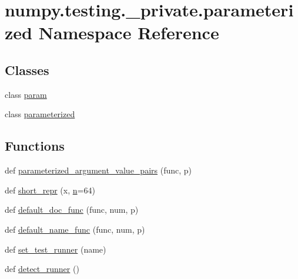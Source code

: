 \hypertarget{namespacenumpy_1_1testing_1_1__private_1_1parameterized}{}\section{numpy.\+testing.\+\_\+private.\+parameterized Namespace Reference}
\label{namespacenumpy_1_1testing_1_1__private_1_1parameterized}
\subsection*{Classes}
\begin{DoxyCompactItemize}
\item 
class \hyperlink{classnumpy_1_1testing_1_1__private_1_1parameterized_1_1param}{param}
\item 
class \hyperlink{classnumpy_1_1testing_1_1__private_1_1parameterized_1_1parameterized}{parameterized}
\end{DoxyCompactItemize}
\subsection*{Functions}
\begin{DoxyCompactItemize}
\item 
def \hyperlink{namespacenumpy_1_1testing_1_1__private_1_1parameterized_a619df385c6fd897bb599e20503b8bf0a}{parameterized\+\_\+argument\+\_\+value\+\_\+pairs} (func, p)
\item 
def \hyperlink{namespacenumpy_1_1testing_1_1__private_1_1parameterized_afdf47621e356527a1b69af42f9722c60}{short\+\_\+repr} (x, \hyperlink{namespacenumpy_a352663c52853d2754274407d5cae2832}{n}=64)
\item 
def \hyperlink{namespacenumpy_1_1testing_1_1__private_1_1parameterized_a4b29c28a2677fa8772a746cad0bc5477}{default\+\_\+doc\+\_\+func} (func, num, p)
\item 
def \hyperlink{namespacenumpy_1_1testing_1_1__private_1_1parameterized_a0ef3141abe5db2ac53b3e85b74669d01}{default\+\_\+name\+\_\+func} (func, num, p)
\item 
def \hyperlink{namespacenumpy_1_1testing_1_1__private_1_1parameterized_ac7f594901632cbabf64628092a88acb9}{set\+\_\+test\+\_\+runner} (name)
\item 
def \hyperlink{namespacenumpy_1_1testing_1_1__private_1_1parameterized_a6d61f5bcd55dbebd32bda0362aa0e7e0}{detect\+\_\+runner} ()
\end{DoxyCompactItemize}


